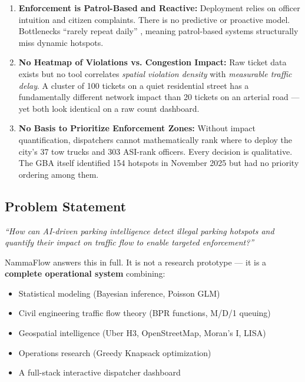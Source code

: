 \documentclass[12pt,a4paper]{article}
\begin{document}
\begin{tcolorbox}[warnbox, title={Three Structural Failures of Current Enforcement}]
\begin{enumerate}[leftmargin=1.5em, itemsep=4pt]
    \item \textbf{Enforcement is Patrol-Based and Reactive:} Deployment relies on officer intuition and citizen complaints. There is no predictive or proactive model. Bottlenecks ``rarely repeat daily'' \cite{pmc2024}, meaning patrol-based systems structurally miss dynamic hotspots.
    
    \item \textbf{No Heatmap of Violations vs. Congestion Impact:} Raw ticket data exists but no tool correlates \textit{spatial violation density} with \textit{measurable traffic delay}. A cluster of 100 tickets on a quiet residential street has a fundamentally different network impact than 20 tickets on an arterial road — yet both look identical on a raw count dashboard.
    
    \item \textbf{No Basis to Prioritize Enforcement Zones:} Without impact quantification, dispatchers cannot mathematically rank where to deploy the city's 37 tow trucks and 303 ASI-rank officers. Every decision is qualitative. The GBA itself identified 154 hotspots in November 2025 but had no priority ordering among them.
\end{enumerate}
\end{tcolorbox}

\subsection{Problem Statement}

\begin{tcolorbox}[problembox, title={Core Problem Statement (Verbatim)}]
\textit{``How can AI-driven parking intelligence detect illegal parking hotspots and quantify their impact on traffic flow to enable targeted enforcement?''}
\end{tcolorbox}

NammaFlow answers this in full. It is not a research prototype — it is a \textbf{complete operational system} combining:
\begin{itemize}
    \item Statistical modeling (Bayesian inference, Poisson GLM)
    \item Civil engineering traffic flow theory (BPR functions, M/D/1 queuing)
    \item Geospatial intelligence (Uber H3, OpenStreetMap, Moran's I, LISA)
    \item Operations research (Greedy Knapsack optimization)
    \item A full-stack interactive dispatcher dashboard
\end{itemize}
\end{document}

